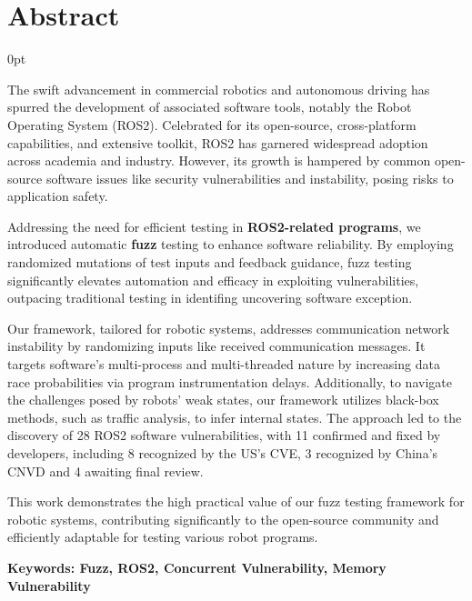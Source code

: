 \documentclass[zihao=-4]{ctexart}
\newcommand{\setParDis}{\setlength {\parskip} {0pt} }
\begin{document}
\section*{\textbf{Abstract}} %
\begin{spacing}{1.5}
\begin{adjustwidth}{0.42cm}{0.42cm}
\setParDis %

\noindent\hspace{\parindent}The swift advancement in commercial robotics and
autonomous driving has spurred the development of associated software tools,
notably the Robot Operating System (ROS2). Celebrated for its open-source,
cross-platform capabilities, and extensive toolkit, ROS2 has garnered widespread
adoption across academia and industry. However, its growth is hampered by common
open-source software issues like security vulnerabilities and instability,
posing risks to application safety.

Addressing the need for efficient testing in \textbf{ROS2-related programs}, we
introduced automatic \textbf{fuzz} testing to enhance software reliability. By
employing randomized mutations of test inputs and feedback guidance, fuzz
testing significantly elevates automation and efficacy in exploiting
vulnerabilities, outpacing traditional testing in identifing uncovering software
exception.

Our framework, tailored for robotic systems, addresses communication network
instability by randomizing inputs like received communication messages. It
targets software's multi-process and multi-threaded nature by increasing data
race probabilities via program instrumentation delays. Additionally, to navigate
the challenges posed by robots' weak states, our framework utilizes black-box
methods, such as traffic analysis, to infer internal states. The approach led to
the discovery of 28 ROS2 software vulnerabilities, with 11 confirmed and fixed
by developers, including 8 recognized by the US's CVE, 3 recognized by China's
CNVD and 4 awaiting final review.

This work demonstrates the high practical value of our fuzz testing framework
for robotic systems, contributing significantly to the open-source community and
efficiently adaptable for testing various robot programs.

\textbf{Keywords: Fuzz, ROS2, Concurrent Vulnerability, Memory Vulnerability}
\end{adjustwidth}
\end{spacing}
\end{document}
